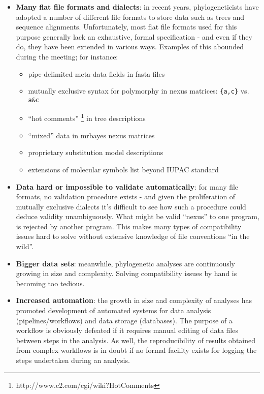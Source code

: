 \documentclass{article}
\begin{document}
\begin{itemize}

\item \textbf{Many flat file formats and dialects}: in recent years,
phylogeneticists have adopted a number of different file formats to
store data such as trees and sequence alignments. Unfortunately, most
flat file formats used for this purpose generally lack an exhaustive,
formal specification - and even if they do, they have been extended in
various ways. Examples of this abounded during the meeting; for
instance:

\begin{itemize}

\item pipe-delimited meta-data fields in fasta files

\item mutually exclusive syntax for polymorphy in nexus matrices:
\verb={a,c}= vs. \verb=a&c=

\item ``hot comments'' \footnote{http://www.c2.com/cgi/wiki?HotComments}
in tree descriptions

\item ``mixed'' data in mrbayes nexus matrices

\item proprietary substitution model descriptions

\item extensions of molecular symbols list beyond IUPAC standard

\end{itemize}

\item \textbf{Data hard or impossible to validate automatically}: for
many file formats, no validation procedure exists - and given the
proliferation of mutually exclusive dialects it's difficult to see how
such a procedure could deduce validity unambiguously. What might be
valid ``nexus'' to one program, is rejected by another program. This
makes many types of compatibility issues hard to solve without extensive
knowledge of file conventions ``in the wild''.

\item \textbf{Bigger data sets}: meanwhile, phylogenetic analyses are
continuously growing in size and complexity. Solving compatibility
issues by hand is becoming too tedious.

\item \textbf{Increased automation}: the growth in size and complexity
of analyses has promoted development of automated systems for data
analysis (pipelines/workflows) and data storage (databases). The purpose
of a workflow is obviously defeated if it requires manual editing of
data files between steps in the analysis. As well, the reproducibility
of results obtained from complex workflows is in doubt if no formal
facility exists for logging the steps undertaken during an analysis.


\end{itemize}
\end{document}
